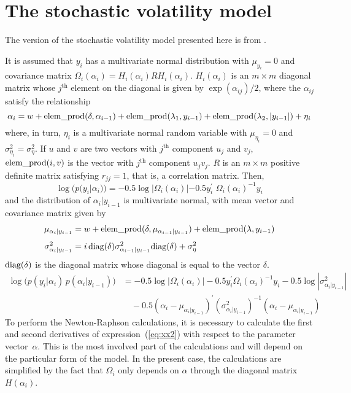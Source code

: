 \section{The stochastic volatility model}

The version of the stochastic volatility model presented here is from
\cite{RePEc:eee:empfin:v:5:y:1998:i:2:p:155-173}.

It is assumed that $y_i$ has a multivariate normal distribution with
$\mu_{y_i}=0$ and covariance matrix 
$\Omega_i(\alpha_i)=H_i(\alpha_i)RH_i(\alpha_i)$.
$H_i(\alpha_i)$ is an $m\times m$ diagonal matrix whose $j^\textrm{th}$ element
on the diagonal is given by $\exp(\alpha_{ij})/2$, where the
$\alpha_{ij}$ satisfy the relationship
\begin{equation}
  \alpha_i=w+\textrm{elem\_prod}(\delta,\alpha_{i-1}) +\textrm{elem\_prod}(\lambda_1,y_{i-1}) 
   + \textrm{elem\_prod}(\lambda_2,|y_{i-1}|) + \eta_i
\end{equation}
where, in turn, $\eta_i$ is a multivariate normal random variable with
$\mu_{\eta_i}=0$ and $\sigma^2_{\eta_i}=\sigma^2_\eta$.
If $u$ and $v$ are two vectors with $j^\textrm{th}$ component $u_j$ and $v_j$,
$\textrm{elem\_prod}(i,v)$ is the vector with $j^\textrm{th}$ component $u_jv_j$.
$R$ is an  $m\times m$ positive definite matrix satisfying $r_{jj}=1$,
that is, a correlation matrix.
Then,
\begin{equation}
  \log\big(p(y_i | \alpha_i)\big)=
     -0.5\log|\Omega_i(\alpha_i)|-0.5y^\prime_i\,\,\Omega_i(\alpha_i)^{-1}y_i
\end{equation}
and the distribution of $\alpha_i|y_{i-1}$ is multivariate normal, with
mean vector and covariance matrix given by
\begin{align}
  \mu_{\alpha_i|y_{i-1}}&=w+\textrm{elem\_prod}(\delta,\mu_{\alpha_{i-1}|y_{i-1}})
     +\textrm{elem\_prod}(\lambda,y_{i-1})\\[4pt]
  \sigma^2_{\alpha_i|y_{i-1}}&=i\,\textrm{diag}(\delta)
   \sigma^2_{\alpha_{i-1}|y_{i-1}}\textrm{diag}(\delta) 
  +\sigma^2_\eta 
\end{align}
$\textrm{diag}(\delta)$ is the diagonal matrix whose diagonal is equal to the vector
$\delta$. 
\begin{align} \label{eq:xx2}
  \log\big(p(y_i|\alpha_i)\,p(\alpha_i|y_{i-1})\big)&=
     -0.5\log|\Omega_i(\alpha_i)|-0.5y_i^\prime\Omega_i(\alpha_i)^{-1}y_i
     -0.5\log|\sigma^2_{\alpha_i|y_{i-1}}|\\[6pt]
     &\quad   -0.5(\alpha_i-\mu_{\alpha_i|y_{i-1}})^\prime
          (\sigma^2_{\alpha_i|y_{i-1}})^{-1}
             (\alpha_i-\mu_{\alpha_i|y_{i-1}}) 
\end{align}
To perform the Newton-Raphson calculations, it is necessary to calculate
the first and second derivatives of expression~(\ref{eq:xx2}) with respect
to the parameter vector~$\alpha$. This is the most involved part of the
calculations and will depend on the particular form of the model. In the present
case, the calculations are simplified by the fact that $\Omega_i$ only depends on
$\alpha$ through the diagonal matrix $H(\alpha_i)$.

